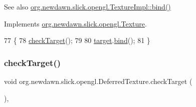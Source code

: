 \begin{DoxySeeAlso}{See also}
\mbox{\hyperlink{classorg_1_1newdawn_1_1slick_1_1opengl_1_1_texture_impl_a181498048d34fa8da8a86613d524f68e}{org.\+newdawn.\+slick.\+opengl.\+Texture\+Impl\+::bind()}} 
\end{DoxySeeAlso}


Implements \mbox{\hyperlink{interfaceorg_1_1newdawn_1_1slick_1_1opengl_1_1_texture_a97c02b82a8170c4c0bccb570dc872873}{org.\+newdawn.\+slick.\+opengl.\+Texture}}.


\begin{DoxyCode}
77                        \{
78         \mbox{\hyperlink{classorg_1_1newdawn_1_1slick_1_1opengl_1_1_deferred_texture_a22f14bcd9cbd4bf033e2308b90464dce}{checkTarget}}();
79 
80         \mbox{\hyperlink{classorg_1_1newdawn_1_1slick_1_1opengl_1_1_deferred_texture_aa70a4b195d0b965a0099d0e7bc18d9d2}{target}}.\mbox{\hyperlink{classorg_1_1newdawn_1_1slick_1_1opengl_1_1_texture_impl_a181498048d34fa8da8a86613d524f68e}{bind}}();
81     \}
\end{DoxyCode}
\mbox{\label{classorg_1_1newdawn_1_1slick_1_1opengl_1_1_deferred_texture_a22f14bcd9cbd4bf033e2308b90464dce}} 
\subsubsection{\texorpdfstring{check\+Target()}{checkTarget()}}
{\footnotesize\ttfamily void org.\+newdawn.\+slick.\+opengl.\+Deferred\+Texture.\+check\+Target (\begin{DoxyParamCaption}{ }\end{DoxyParamCaption})\hspace{0.3cm}{\ttfamily [inline]}, {\ttfamily [private]}}


